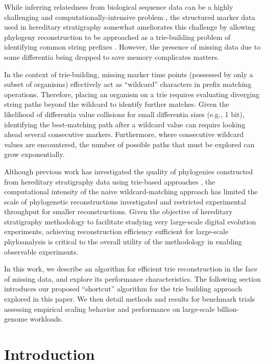 While inferring relatedness from biological sequence data can be a highly challenging and computationally-intensive problem \citep{miller2010creating},
the structured marker data used in hereditary stratigraphy somewhat ameliorates this challenge by allowing phylogeny reconstruction to be approached as a trie-building problem of identifying common string prefixes \citep{delabriandais1959file,moreno2024analysis}.
However, the presence of missing data due to some differentia being dropped to save memory complicates matters.

In the context of trie-building, missing marker time points (possessed by only a subset of organisms) effectively act as ``wildcard'' characters in prefix matching operations.
Therefore, placing an organism on a trie requires evaluating diverging string paths beyond the wildcard to identify further matches.
Given the likelihood of differentia value collisions for small differentia sizes (e.g., 1 bit), identifying the best-matching path after a wildcard value can require looking ahead several consecutive markers.
Furthermore, where consecutive wildcard values are encountered, the number of possible paths that must be explored can grow exponentially.

Although previous work has investigated the quality of phylogenies constructed from hereditary stratigraphy data using trie-based approaches \citep{moreno2025testing}, the computational intensity of the naive wildcard-matching approach has limited the scale of phylogenetic reconstructions investigated and restricted experimental throughput for smaller reconstructions.
Given the objective of hereditary stratigraphy methodology to facilitate studying very large-scale digital evolution experiments, achieving reconstruction efficiency sufficient for large-scale phyloanalysis is critical to the overall utility of the methodology in enabling observable experiments.

In this work, we describe an algorithm for efficient trie reconstruction in the face of missing data, and explore its performance characteristics.
The following section introduces our proposed ``shortcut'' algorithm for the trie building approach explored in this paper.
We then detail methods and results for benchmark trials assessing empirical scaling behavior and performance on large-scale billion-genome workloads.

\section{Introduction} \label{sec:introduction}


